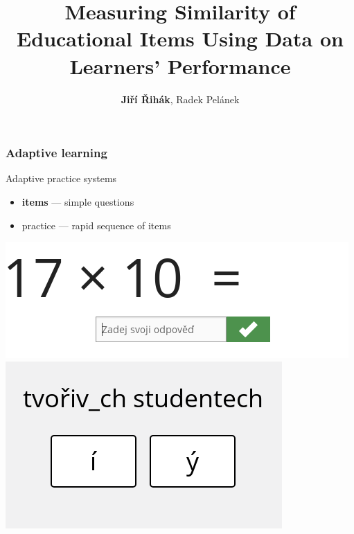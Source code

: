 \documentclass[xcolor=svgnames]{beamer}
\title[Similarity measures]{Measuring Similarity of Educational Items Using Data on Learners' Performance}
\author{\textbf{Ji\v{r}í \v{R}ihák}, Radek Pelánek}
\institute{Masaryk University Brno}
\date{}
\begin{document}
\frame[plain]{\titlepage}
\begin{frame}
    \frametitle{Adaptive learning}

    \Large

    Adaptive practice systems
    \begin{itemize}
        \item \textbf{items} --- simple questions
        \item practice --- rapid sequence of items
    \end{itemize}


    \vfill
    \centering

    \includegraphics[width=.45\linewidth]{figures/matmat.png}
    \includegraphics[width=.45\linewidth]{figures/cestina.png}


\end{frame}
\end{document}
